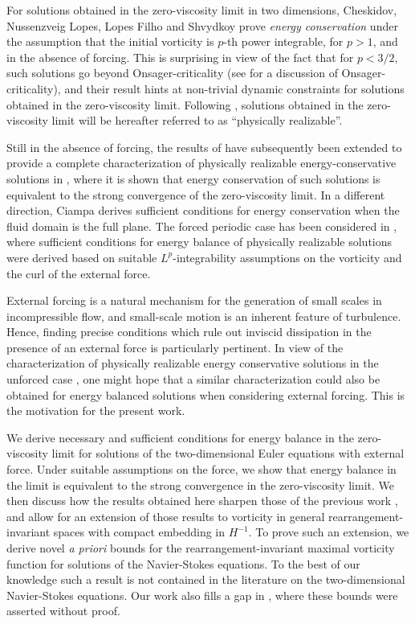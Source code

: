 \documentclass[reqno,12pt]{amsart}
\begin{document}
For solutions obtained in the zero-viscosity limit in two dimensions, Cheskidov, Nussenzveig Lopes, Lopes Filho and Shvydkoy \cite{CLNS2016} prove \emph{energy conservation} under the assumption that the initial vorticity is $p$-th power integrable, for $p>1$, and in the absence of forcing. This is surprising in view of the fact that for $p<3/2$, such solutions go beyond Onsager-criticality (see \cite{Shvydkoy2010} for a discussion of Onsager-criticality), and their result hints at non-trivial dynamic constraints for solutions obtained in the zero-viscosity limit. Following \cite{CLNS2016}, solutions obtained in the zero-viscosity limit will be hereafter referred to as ``physically realizable''.

Still in the absence of forcing, the results of \cite{CLNS2016} have subsequently been extended to provide a complete characterization of physically realizable energy-conservative solutions in \cite{LMPP2021a}, where it is shown that energy conservation of such solutions is equivalent to the strong convergence of the zero-viscosity limit. In a different direction, Ciampa \cite{ciampa2022energy} derives sufficient conditions for energy conservation when the fluid domain is the full plane. The forced periodic case has been considered in \cite{LN2022}, where sufficient conditions for energy balance of physically realizable solutions were derived based on suitable $L^p$-integrability assumptions on the vorticity and the curl of the external force.

External forcing is a natural mechanism for the generation of small scales in incompressible flow, and small-scale motion is an inherent feature of turbulence. Hence, finding precise conditions which rule out inviscid dissipation in the presence of an external force is particularly pertinent. In view of the characterization of physically realizable energy conservative solutions in the unforced case \cite{LMPP2021a}, one might hope that a similar characterization could also be obtained for energy balanced solutions when considering external forcing. This is the motivation for the present work.

We derive necessary and sufficient conditions for energy balance in the zero-viscosity limit for solutions of the two-dimensional Euler equations with external force. Under suitable assumptions on the force, we show that energy balance in the limit is equivalent to the strong convergence in the zero-viscosity limit. We then discuss how the results obtained here sharpen those of the previous work \cite{LN2022}, and allow for an extension of those results to vorticity in general rearrangement-invariant spaces with compact embedding in $H^{-1}$.
To prove such an extension, we derive novel {\it a priori} bounds for the rearrangement-invariant maximal vorticity function for solutions of the Navier-Stokes equations. To the best of our knowledge such a result is not contained in the literature on the two-dimensional Navier-Stokes equations. Our work also fills a gap in \cite[Corollary 2.13]{LMPP2021a}, where these bounds were asserted without proof.
\end{document}
